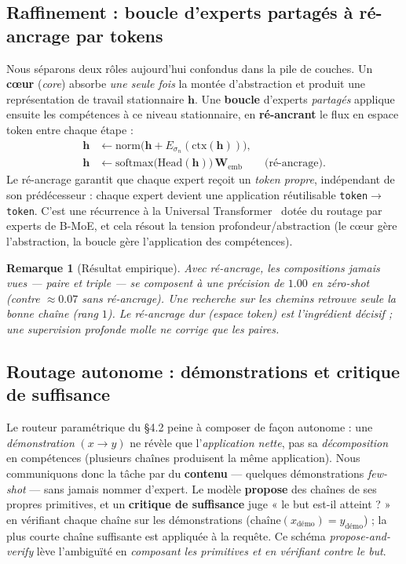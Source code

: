 \documentclass[10pt,a4paper]{article}
\newtheorem{remark}{Remarque}
\begin{document}
\subsection{Raffinement : boucle d'experts partagés à ré-ancrage par tokens}
Nous séparons deux rôles aujourd'hui confondus dans la pile de couches. Un \textbf{cœur} (\textit{core}) absorbe \emph{une seule fois} la montée d'abstraction et produit une représentation de travail stationnaire $\mathbf{h}$. Une \textbf{boucle} d'experts \emph{partagés} applique ensuite les compétences à ce niveau stationnaire, en \textbf{ré-ancrant} le flux en espace token entre chaque étape :
\begin{align}
\mathbf{h} &\leftarrow \mathrm{norm}\!\big(\mathbf{h} + E_{\sigma_n}(\mathrm{ctx}(\mathbf{h}))\big), \\
\mathbf{h} &\leftarrow \mathrm{softmax}\!\big(\mathrm{Head}(\mathbf{h})\big)\, \mathbf{W}_{\mathrm{emb}} \qquad \text{(ré-ancrage)} .
\end{align}
Le ré-ancrage garantit que chaque expert reçoit un \emph{token propre}, indépendant de son prédécesseur : chaque expert devient une application réutilisable \texttt{token}$\to$\texttt{token}. C'est une récurrence à la Universal Transformer~\cite{dehghani2019universal} dotée du routage par experts de B-MoE, et cela résout la tension profondeur/abstraction (le cœur gère l'abstraction, la boucle gère l'application des compétences).

\begin{remark}[Résultat empirique]
Avec ré-ancrage, les compositions \emph{jamais vues} --- paire \emph{et} triple --- se composent à une précision de $1.00$ en zéro-shot (contre $\approx 0.07$ sans ré-ancrage). Une recherche sur les chemins retrouve seule la bonne chaîne (rang $1$). Le ré-ancrage \emph{dur} (espace token) est l'ingrédient décisif ; une supervision profonde \emph{molle} ne corrige que les paires.
\end{remark}

\subsection{Routage autonome : démonstrations et critique de suffisance}
Le routeur paramétrique du §4.2 peine à composer de façon autonome : une \emph{démonstration} $(x\!\to\!y)$ ne révèle que l'\emph{application nette}, pas sa \emph{décomposition} en compétences (plusieurs chaînes produisent la même application). Nous communiquons donc la tâche par du \textbf{contenu} --- quelques démonstrations \emph{few-shot} --- sans jamais nommer d'expert. Le modèle \textbf{propose} des chaînes de ses propres primitives, et un \textbf{critique de suffisance} juge « le but est-il atteint ? » en vérifiant chaque chaîne sur les démonstrations ($\text{chaîne}(x_{\text{démo}}) = y_{\text{démo}}$) ; la plus courte chaîne suffisante est appliquée à la requête. Ce schéma \emph{propose-and-verify} lève l'ambiguïté en \emph{composant les primitives et en vérifiant contre le but}.
\end{document}
